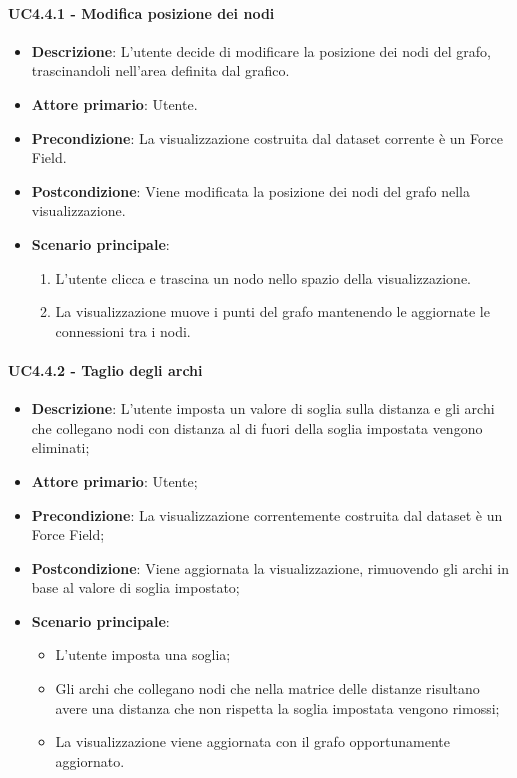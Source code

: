 \paragraph{UC4.4.1 - Modifica posizione dei nodi}
\label{par:uc4.4.1}
\begin{itemize}
    \item \textbf{Descrizione}: L’utente decide di modificare la posizione dei nodi del grafo,
                                trascinandoli nell'area definita dal grafico.

    \item \textbf{Attore primario}: Utente.

    \item \textbf{Precondizione}:   La visualizzazione costruita dal dataset corrente è un Force Field.
    \item \textbf{Postcondizione}:  Viene modificata la posizione dei nodi del grafo nella visualizzazione.

	\item \textbf{Scenario principale}:
        \begin{enumerate}
            \item L'utente clicca e trascina un nodo nello spazio della visualizzazione.
            \item La visualizzazione muove i punti del grafo mantenendo le aggiornate le connessioni tra i nodi.
        \end{enumerate}
\end{itemize}

\paragraph{UC4.4.2 - Taglio degli archi}
\label{par:uc4.4.2}
\begin{itemize}
    \item \textbf{Descrizione}:     L'utente imposta un valore di soglia sulla distanza e gli archi che collegano nodi con distanza al di fuori della soglia impostata vengono eliminati;
    \item \textbf{Attore primario}: Utente;
    \item \textbf{Precondizione}:   La visualizzazione correntemente costruita dal dataset è un Force Field;
    \item \textbf{Postcondizione}:  Viene aggiornata la visualizzazione, rimuovendo gli archi in base al valore di soglia impostato;
    \item \textbf{Scenario principale}:
    \begin{itemize}
        \item L'utente imposta una soglia;
        \item Gli archi che collegano nodi che nella matrice delle distanze risultano avere una distanza che non rispetta la soglia impostata vengono rimossi;
        \item La visualizzazione viene aggiornata con il grafo opportunamente aggiornato.
    \end{itemize}
\end{itemize}

